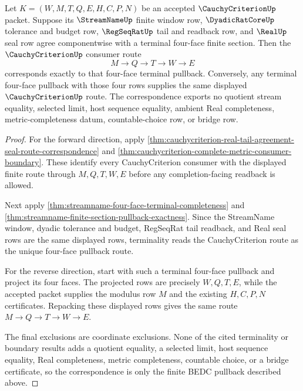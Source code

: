 \begin{theorem}
\label{thm:cauchycriterion-streamname-four-face-pullback-correspondence}
Let $K=(W,M,T,Q,E,H,C,P,N)$ be an accepted $\CauchyCriterionUp$ packet. Suppose
its $\StreamNameUp$ finite window row, $\DyadicRatCoreUp$ tolerance and budget
row, $\RegSeqRatUp$ tail and readback row, and $\RealUp$ seal row agree
componentwise with a terminal four-face finite section. Then the
$\CauchyCriterionUp$ consumer route
$$
M\to Q\to T\to W\to E
$$
corresponds exactly to that four-face terminal pullback. Conversely, any
terminal four-face pullback with those four rows supplies the same displayed
$\CauchyCriterionUp$ route. The correspondence exports no quotient stream
equality, selected limit, host sequence equality, ambient Real completeness,
metric-completeness datum, countable-choice row, or bridge row.
\end{theorem}
\begin{proof}
For the forward direction, apply
\autoref{thm:cauchycriterion-real-tail-agreement-seal-route-correspondence} and
\autoref{thm:cauchycriterion-complete-metric-consumer-boundary}. These identify
every CauchyCriterion consumer with the displayed finite route through
$M,Q,T,W,E$ before any completion-facing readback is allowed.

Next apply \autoref{thm:streamname-four-face-terminal-completeness} and
\autoref{thm:streamname-finite-section-pullback-exactness}. Since the
StreamName window, dyadic tolerance and budget, RegSeqRat tail readback, and
Real seal rows are the same displayed rows, terminality reads the
CauchyCriterion route as the unique four-face pullback route.

For the reverse direction, start with such a terminal four-face pullback and
project its four faces. The projected rows are precisely $W,Q,T,E$, while the
accepted packet supplies the modulus row $M$ and the existing $H,C,P,N$
certificates. Repacking these displayed rows gives the same route
$M\to Q\to T\to W\to E$.

The final exclusions are coordinate exclusions. None of the cited terminality
or boundary results adds a quotient equality, a selected limit, host sequence
equality, Real completeness, metric completeness, countable choice, or a bridge
certificate, so the correspondence is only the finite BEDC pullback described
above.
\end{proof}

